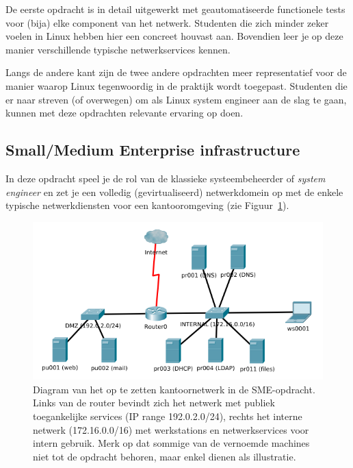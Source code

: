 De eerste opdracht is in detail uitgewerkt met geautomatiseerde functionele tests voor (bija) elke component van het netwerk. Studenten die zich minder zeker voelen in Linux hebben hier een concreet houvast aan. Bovendien leer je op deze manier verschillende typische netwerkservices kennen.

Langs de andere kant zijn de twee andere opdrachten meer representatief voor de manier waarop Linux tegenwoordig in de praktijk wordt toegepast. Studenten die er naar streven (of overwegen) om als Linux system engineer aan de slag te gaan, kunnen met deze opdrachten relevante ervaring op doen.

\subsection{Small/Medium Enterprise infrastructure}
\label{subs:smallmedium-enterprise-infrastructure}

In deze opdracht speel je de rol van de klassieke systeembeheerder of \textit{system engineer} en zet je een volledig (gevirtualiseerd) netwerkdomein op met de enkele typische netwerkdiensten voor een kantooromgeving (zie Figuur~\ref{fig:sme}).

\begin{figure}
  \centering
  \includegraphics[width=\textwidth]{img/assignment-sme.png}
  \caption[Netwerkdiagram SME-opdracht]{Diagram van het op te zetten kantoornetwerk in de SME-opdracht. Links van de router bevindt zich het netwerk met publiek toegankelijke services (IP range 192.0.2.0/24), rechts het interne netwerk (172.16.0.0/16) met werkstations en netwerkservices voor intern gebruik. Merk op dat sommige van de vernoemde machines niet tot de opdracht behoren, maar enkel dienen als illustratie.}
  \label{fig:sme}
\end{figure}


